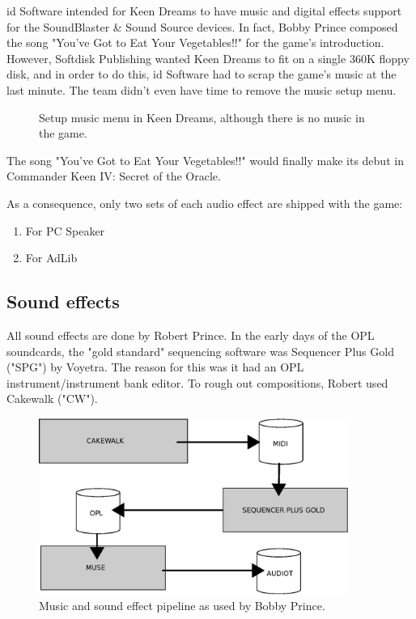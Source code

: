\documentclass[book.tex]{subfiles}
\begin{document}
id Software intended for Keen Dreams to have music and digital effects support for the SoundBlaster \& Sound Source devices. In fact, Bobby Prince composed the song "You've Got to Eat Your Vegetables!!" for the game's introduction. However, Softdisk Publishing wanted Keen Dreams to fit on a single 360K floppy disk, and in order to do this, id Software had to scrap the game's music at the last minute. The team didn't even have time to remove the music setup menu.\\

\par
\par
\begin{figure}[H]
\centering
{}
\caption{Setup music menu in Keen Dreams, although there is no music in the game.}
\end{figure}
\par


\par
{} The song "You've Got to Eat Your Vegetables!!" would finally make its debut in Commander Keen IV: Secret of the Oracle.\\
\par

As a consequence, only two sets of each audio effect are shipped with the game:
\begin{enumerate}
\item For PC Speaker
\item For AdLib
\end{enumerate}



\subsection{Sound effects}
All sound effects are done by Robert Prince. In the early days of the OPL soundcards, the "gold standard" sequencing software was Sequencer Plus Gold ("SPG") by Voyetra. The reason for this was it had an OPL instrument/instrument bank editor. To rough out compositions, Robert used Cakewalk ("CW").\\
 \par
\begin{figure}[H]
\centering

 \includegraphics[width=0.9\textwidth]{imgs/drawings/music_pipelione.eps}
 \caption{Music and sound effect pipeline as used by Bobby Prince.}
\end{figure}
\par
\end{document}
